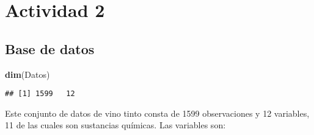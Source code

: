 \documentclass[
]{article}
\newenvironment{Shaded}{\begin{snugshade}}{\end{snugshade}}
\newcommand{\KeywordTok}[1]{\textcolor[rgb]{0.13,0.29,0.53}{\textbf{#1}}}
\newcommand{\NormalTok}[1]{#1}
\begin{document}
\hypertarget{actividad-2}{%
\section{Actividad 2}\label{actividad-2}}

\hypertarget{base-de-datos}{%
\subsection{Base de datos}\label{base-de-datos}}

\begin{Shaded}
\begin{Highlighting}[]
\KeywordTok{dim}\NormalTok{(Datos)}
\end{Highlighting}
\end{Shaded}

\begin{verbatim}
## [1] 1599   12
\end{verbatim}

Este conjunto de datos de vino tinto consta de 1599 observaciones y 12
variables, 11 de las cuales son sustancias químicas. Las variables son:
\end{document}
